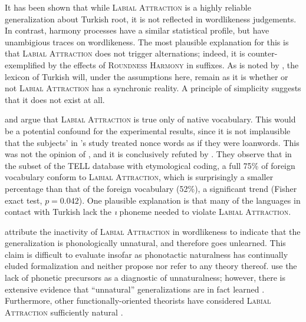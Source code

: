 It has been shown that while \textsc{Labial Attraction} is a highly reliable generalization about Turkish root, it is not reflected in wordlikeness judgements. In contrast, harmony processes have a similar statistical profile, but have unambigious traces on wordlikeness. The most plausible explanation for this is that  \textsc{Labial Attraction} does not trigger alternations; indeed, it is counter-exemplified by the effects of \textsc{Roundness Harmony} in suffixes. As is noted by \citet[412f.]{Inkelas1997}, the lexicon of Turkish will, under the assumptions here, remain as it is whether or not \textsc{Labial Attraction} has a synchronic reality. A principle of simplicity suggests that it does not exist at all.

\citet{NiChiosain1993} and \citet{Ito1995b} argue that \textsc{Labial Attraction} is true only of native vocabulary. This would be a potential confound for the experimental results, since it is not implausible that the subjects' in \citeauthor{Zimmer1969}'s study treated nonce words as if they were loanwords. 
This was not the opinion of \citet[266]{Lees1966a}, and it is conclusively refuted by  \citet{Inkelas2001}. They observe that in the subset of the TELL database with etymological coding, a full 75\% of foreign vocabulary conform to \textsc{Labial Attraction}, which is surprisingly a smaller percentage than that of the foreign vocabulary (52\%), a significant trend (Fisher exact test, $p = 0.042$). One plausible explanation is that many of the languages in contact with Turkish lack the \emph{ı} phoneme needed to violate \textsc{Labial Attraction}.

\citet{Becker2011} attribute the inactivity of \textsc{Labial Attraction} in wordlikeness to indicate that the generalization is phonologically unnatural, and therefore goes unlearned. This claim is difficult to evaluate insofar as phonotactic naturalness has continually eluded formalization and \citeauthor{Becker2011} neither propose nor refer to any theory thereof. \citeauthor{Becker2011} use the lack of phonetic precursors as a diagnostic of unnaturalness; however, there is extensive evidence that ``unnatural'' generalizations are in fact learned \citep[e.g.,][]{Anderson1981,Bach1972,Blevins2004,Buckley2000a,Hayes2009,Pierrehumbert2006c}. Furthermore, other functionally-oriented theorists have considered \textsc{Labial Attraction} sufficiently natural \citep[e.g.,][]{NiChiosain1993,Ito1993,Ito1995b}. 

